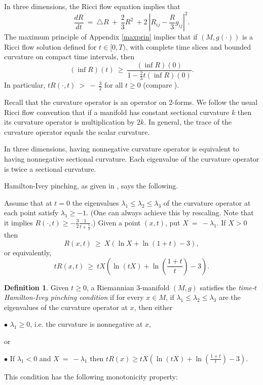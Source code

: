 \documentclass[12pt]{amsart}
\newcommand{\la}{\lambda}
\numberwithin{equation}{section}
\theoremstyle{plain}
\theoremstyle{definition}
\newtheorem{definition}[equation]{Definition}
\theoremstyle{remark}
\begin{document}
In three dimensions,
the Ricci flow equation implies that
\begin{equation} \label{3dR}
\frac{dR}{dt} \: = \:
\triangle R \: + \: \frac{2}{3} R^2 \: + 
2 \: |R_{ij} - \frac{R}{3} g_{ij}|^2 .  
\end{equation}
The maximum principle of Appendix \ref{maxprin} implies that
if $(M, g(\cdot))$ is a Ricci flow solution defined for
$t \in [0, T)$, with complete time slices and bounded curvature
on compact time intervals, then
\begin{equation} \label{Rlowerbound}
(\inf R)(t) \: \ge \: 
\frac{(\inf R)(0)}
{1 - \frac23 t (\inf R)(0)}.
\end{equation}
In particular,
$tR(\cdot, t) \: > \: - \: \frac{3}{2}$ for all $t \ge 0$
(compare \cite[Section 2]{Hamiltonn}).

Recall that the curvature operator is an operator on $2$-forms.
We follow the usual Ricci flow convention that if a manifold
has constant sectional curvature $k$ then its curvature operator
is multiplication by $2k$. In general, the trace of the
curvature operator equals the scalar curvature.

In three dimensions, having nonnegative
curvature operator is equivalent to having nonnegative
sectional curvature.  Each eigenvalue of the curvature operator
is twice a sectional curvature.

Hamilton-Ivey pinching, as given
in \cite[Theorem 4.1]{Hamiltonn}, says the following.

Assume that at $t = 0$ the eigenvalues $\lambda_1 \le \lambda_2 \le
\lambda_3$ of the
curvature operator at each point satisfy $\lambda_1 \ge -1$.
(One can
always achieve this by rescaling. Note that it implies
$R(\cdot, t) \ge - \frac32 \frac{1}{t+\frac12}$.)
Given a point $(x, t)$, put $X \: = \: - \lambda_1$.
If $X > 0$ then
\begin{equation}
R(x, t) \: \ge \: X \left( \ln X + \ln(1+t) - 3 \right),
\end{equation}
or equivalently,
\begin{equation} \label{estimate}
tR(x, t) \: \ge \: tX \left( \ln(tX) + \ln(\frac{1+t}{t}) - 3 \right).
\end{equation}

\begin{definition} \label{HamIvey}
Given $t\geq 0$, a Riemannian $3$-manifold $(M,g)$ satisfies the 
{\em  time-$t$ Hamilton-Ivey pinching condition} if for every $x\in M$,
if $\la_1\leq \la_2\leq \la_3$ are the eigenvalues of the curvature operator at $x$,
then either 

$\bullet$ $\la_1\geq 0$, i.e. the curvature is nonnegative at $x$,

or

$\bullet$ If $\la_1 < 0$ and $X \: = \: - \lambda_1$ then
$tR(x)\geq tX \left(\ln (tX) + \ln \left( \frac{1+t}{t} \right)-3
\right)$.
\end{definition}
This condition has the following monotonicity property:
\end{document}
